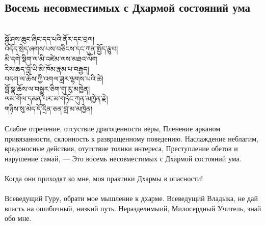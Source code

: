 \subsection*{Восемь несовместимых с Дхармой состояний ума}
\\
\ti
སྐྱོ་ཤས་ཆུང་ཞིང་དད་པའི་ནོར་དང་བྲལ། \\
འདོད་སྲེད་ཞགས་པས་བཅིངས་དང་ཀུན་སྤྱོད་རྩུབ། \\
མི་དགེ་སྡིག་ལ་མི་འཛེམ་ལས་མཐའ་ལོག \\
རིས་ཆད་བློ་ཡི་མི་ཁོམ་རྣམ་པ་བརྒྱད། \\
བདག་ལ་ཆོས་ཀྱི་འགལ་ཟླར་ལྷགས་པའི་ཚེ། \\
བློ་སྣ་ཆོས་ལ་བསྒྱུར་ཅིག་གུ་རུ་མཁྱེན། \\
ལམ་གོལ་དམན་པར་མ་གཏོང་ཀུན་མཁྱེན་རྗེ། \\
གཉིས་སུ་མེད་དོ་དྲིན་ཅན་བླ་མ་མཁྱེན། \\
\\
\ru
Слабое отречение, отсуствие драгоценности веры,
Пленение арканом привязанности, склонность к развращенному поведе\-нию.
Наслаждение неблагим, вредоносные действия, отутствие толики интереса,
Преступление обетов и нарушение самай, —
Это восемь несовместимых с Дхармой состояний ума.\\
\\
Когда они приходят ко мне, моя практики Дхармы в опасности!\\
\\
Всеведущий Гуру, обрати мое мышление к дхарме.
Всеведущий Владыка, не дай впасть на ошибочный, низкий путь.
Нераздели\-мыий, Милосердный Учитель, знай обо мне.

\newpage
